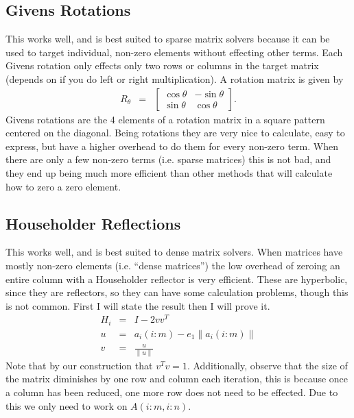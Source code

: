 \subsection{Givens Rotations}
This works well, and is best suited to sparse matrix solvers because it can be used to target individual, non-zero elements without effecting other terms.  Each Givens rotation only effects only two rows or columns in the target matrix (depends on if you do left or right multiplication). A rotation matrix is given by
\begin{eqnarray}
R_{\theta} &=& \left[\begin{matrix}\cos\theta & -\sin\theta\\
                                   \sin\theta & \cos\theta\end{matrix}\right].
\end{eqnarray}
Givens rotations are the 4 elements of a rotation matrix in a square pattern centered on the diagonal.  Being rotations they are very nice to calculate, easy to express, but have a higher overhead to do them for every non-zero term.  When there are only a few non-zero terms (i.e. sparse matrices) this is not bad, and they end up being much more efficient than other methods that will calculate how to zero a zero element.

\subsection{Householder Reflections}
This works well, and is best suited to dense matrix solvers.  When matrices have mostly non-zero elements (i.e. ``dense matrices'') the low overhead of zeroing an entire column with a Householder reflector is very efficient.  These are hyperbolic, since they are reflectors, so they can have some calculation problems, though this is not common.  First I will state the result then I will prove it.
\begin{eqnarray}
H_i &=& I-2vv^T \\
u&=& a_i(i:m)-e_1\|a_i(i:m)\|\\
v&=& \frac{u}{\|u\|}
\end{eqnarray}
Note that by our construction that $v^Tv = 1$.  Additionally, observe that the size of the matrix diminishes by one row and column each iteration, this is because once a column has been reduced, one more row does not need to be effected.  Due to this we only need to work on $A(i:m,i:n)$.

